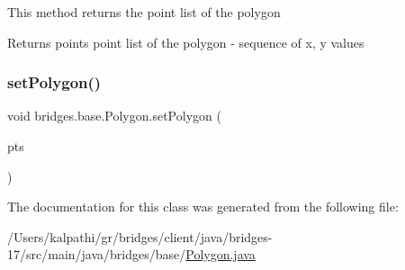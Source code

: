 This method returns the point list of the polygon

\begin{DoxyReturn}{Returns}
points point list of the polygon -\/ sequence of x, y values 
\end{DoxyReturn}
\mbox{\label{classbridges_1_1base_1_1_polygon_ac92747578a038f747de9b2ccc90dc972}} 
\subsubsection{\texorpdfstring{set\+Polygon()}{setPolygon()}}
{\footnotesize\ttfamily void bridges.\+base.\+Polygon.\+set\+Polygon (\begin{DoxyParamCaption}\item[{Array\+List$<$ Float $>$}]{pts }\end{DoxyParamCaption})}



The documentation for this class was generated from the following file\+:\begin{DoxyCompactItemize}
\item 
/\+Users/kalpathi/gr/bridges/client/java/bridges-\/17/src/main/java/bridges/base/\mbox{\hyperlink{_polygon_8java}{Polygon.\+java}}\end{DoxyCompactItemize}
